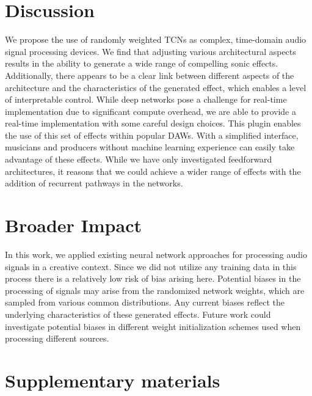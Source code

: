 \documentclass{article}
\begin{document}
\section{Discussion}

We propose the use of randomly weighted TCNs as complex, time-domain audio signal processing devices. 
We find that adjusting various architectural aspects results in the ability to generate a wide range of compelling sonic effects.
Additionally, there appears to be a clear link between different aspects of the architecture and the characteristics of the generated effect, 
which enables a level of interpretable control.
While deep networks pose a challenge for real-time implementation due to significant compute overhead, 
we are able to provide a real-time implementation with some careful design choices. 
This plugin enables the use of this set of effects within popular DAWs. 
With a simplified interface, musicians and producers without machine learning experience can easily take advantage of these effects.
While we have only investigated feedforward architectures, 
it reasons that we could achieve a wider range of effects with the addition of recurrent pathways in the networks.

\section*{Broader Impact}
In this work, we applied existing neural network approaches for processing audio signals in a creative context.
Since we did not utilize any training data in this process there is a relatively low risk of bias arising here. 
Potential biases in the processing of signals may arise from the randomized network weights,
which are sampled from various common distributions. 
Any current biases reflect the underlying characteristics of these generated effects. 
Future work could investigate potential biases in different weight initialization schemes used when processing different sources. 

  


\newpage
\section*{Supplementary materials}
\end{document}
